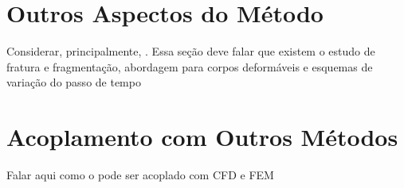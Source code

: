 \section{Outros Aspectos do Método}
\alert{Considerar, principalmente, . Essa seção deve falar que existem o estudo de fratura e fragmentação, abordagem para corpos deformáveis e esquemas de variação do passo de tempo}

\section{Acoplamento com Outros Métodos}
\alert{Falar aqui como o \DEM{} pode ser acoplado com CFD e FEM}
